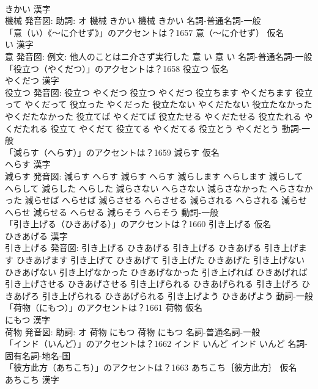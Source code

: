 \documentclass[8pt]{extreport}
\begin{document}
\begin{CJK}{UTF8}{min}
\\	きかい 漢字　
\\	機械 発音図: 助詞: オ	機械 きかい		機械 きかい				名詞-普通名詞-一般 
\\	「意（い）《〜に介せず》」のアクセントは？1657	意（〜に介せず） 仮名　
\\	い 漢字　
\\	意 発音図: 例文: 他人のことはニ介さず実行した	意 い		意 い				名詞-普通名詞-一般 
\\	「役立つ（やくだつ）」のアクセントは？1658	役立つ 仮名　
\\	やくだつ 漢字　
\\	役立つ 発音図:	役立つ やくだつ		役立つ やくだつ 役立ちます やくだちます 役立って やくだって 役立った やくだった 役立たない やくだたない 役立たなかった やくだたなかった 役立てば やくだてば 役立たせる やくだたせる 役立たれる やくだたれる 役立て やくだて 役立てる やくだてる 役立とう やくだとう				動詞-一般 
\\	「減らす（へらす）」のアクセントは？1659	減らす 仮名　
\\	へらす 漢字　
\\	減らす 発音図:	減らす へらす		減らす へらす 減らします へらします 減らして へらして 減らした へらした 減らさない へらさない 減らさなかった へらさなかった 減らせば へらせば 減らさせる へらさせる 減らされる へらされる 減らせ へらせ 減らせる へらせる 減らそう へらそう				動詞-一般 
\\	「引き上げる（ひきあげる）」のアクセントは？1660	引き上げる 仮名　
\\	ひきあげる 漢字　
\\	引き上げる 発音図:	引き上げる ひきあげる		引き上げる ひきあげる 引き上げます ひきあげます 引き上げて ひきあげて 引き上げた ひきあげた 引き上げない ひきあげない 引き上げなかった ひきあげなかった 引き上げれば ひきあげれば 引き上げさせる ひきあげさせる 引き上げられる ひきあげられる 引き上げろ ひきあげろ 引き上げられる ひきあげられる 引き上げよう ひきあげよう				動詞-一般 
\\	「荷物（にもつ）」のアクセントは？1661	荷物 仮名　
\\	にもつ 漢字　
\\	荷物 発音図: 助詞: オ	荷物 にもつ		荷物 にもつ				名詞-普通名詞-一般 
\\	「インド（いんど）」のアクセントは？1662		インド いんど		インド いんど				名詞-固有名詞-地名-国 
\\	「彼方此方（あちこち）」のアクセントは？1663	あちこち｛彼方此方｝ 仮名　
\\	あちこち 漢字　

\end{CJK}
\end{document}
